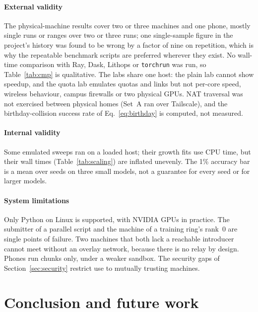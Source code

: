 \documentclass[5p,times,twocolumn]{elsarticle}
\begin{document}
\paragraph{External validity} The physical-machine results cover two or three
machines and one phone, mostly single runs or ranges over two or three runs;
one single-sample figure in the project's history was found to be wrong by a
factor of nine on repetition, which is why the repeatable benchmark scripts are
preferred wherever they exist. No wall-time comparison with Ray, Dask, Lithops
or \texttt{torchrun} was run, so Table~\ref{tab:cmp} is qualitative. The labs
share one host: the plain lab cannot show speedup, and the quota lab emulates
quotas and links but not per-core speed, wireless behaviour, campus firewalls
or two physical GPUs. NAT traversal was not exercised between physical homes
(Set~A ran over Tailscale), and the birthday-collision success rate of
Eq.~\eqref{eq:birthday} is computed, not measured.

\paragraph{Internal validity} Some emulated sweeps ran on a loaded host; their
growth fits use CPU time, but their wall times (Table~\ref{tab:scaling}) are
inflated unevenly. The 1\% accuracy bar is a mean over seeds on three small
models, not a guarantee for every seed or for larger models.

\paragraph{System limitations} Only Python on Linux is supported, with NVIDIA
GPUs in practice. The submitter of a parallel script and the machine of a
training ring's rank~0 are single points of failure. Two machines that both
lack a reachable introducer cannot meet without an overlay network, because
there is no relay by design. Phones run chunks only, under a weaker sandbox.
The security gaps of Section~\ref{sec:security} restrict use to mutually
trusting machines.

\section{Conclusion and future work}
\label{sec:conclusion}
\end{document}
